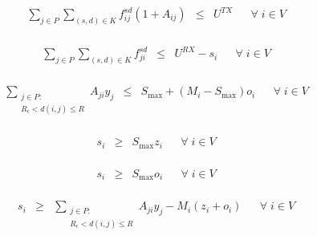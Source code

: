 	\begin{equation*} \label{eq:VcapTX}
	\begin{array}{rrclcl}
		& \displaystyle \sum_{j \in P } \displaystyle \sum_{(s,d) \in K} f^{sd}_{ij} (1 + A_{ij}) & \leq & U^{TX} && \forall \; i \in V \\
	\end{array}
	\end{equation*}
	
	
	\begin{equation*} \label{eq:VcapRX}
	\begin{array}{rrclcl}
	&\displaystyle \sum_{j \in P} \displaystyle \sum_{(s,d) \in K} f^{sd}_{ji} & \leq & U^{RX} - s_{i}  && \forall \; i \in V\\
	\end{array}
	\end{equation*}
	
		\begin{equation*} \label{eq:VsetSub}
		\begin{array}{rrclcl}
		& \displaystyle \sum_{\substack{j \in P :\\ R_{\epsilon} < d(i,j) \le R }} A_{ji} y_{j}  & \leq & S_{\max} + (M_i - S_{\max}) o_i %
		&& \forall \; i \in V\\
		\end{array}
		\end{equation*}
		
		\begin{equation*} \label{eq:VsetSmaxZ}
		\begin{array}{rrclcl}
		&s_{i} & \geq & S_{\max} z_{i}  && \forall \; i \in V \\
		\end{array}
		\end{equation*}
		
		\begin{equation*} \label{eq:VsetSmaxO}
		\begin{array}{rrclcl}
		&s_{i} & \geq & S_{\max} o_{i} && \forall \; i \in V \\
		\end{array}
		\end{equation*}
		
		\begin{equation*} \label{eq:VsetSlb}
		\begin{array}{rrclcl}
		& s_{i} & \geq & \displaystyle \sum_{\substack{j \in P :\\ R_{\epsilon} < d(i,j) \le R} } A_{ji} y_{j}  - M_i (z_i + o_i) %
			&& \forall \; i \in V\\
			\end{array}
			\end{equation*}
			
